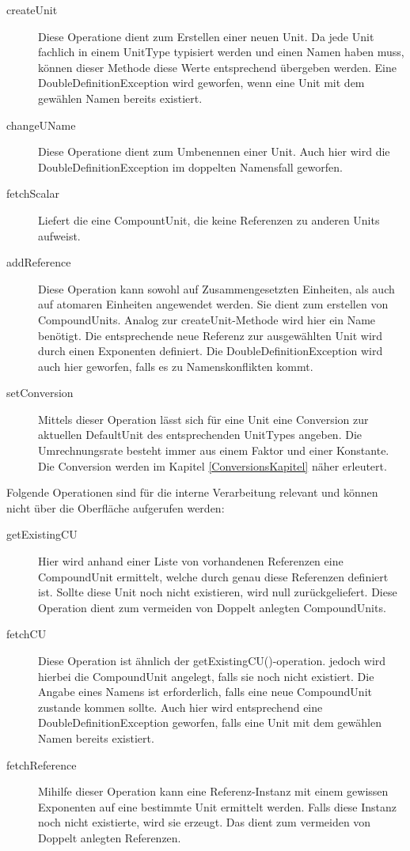 \begin{description}
\item[createUnit]
Diese Operatione dient zum Erstellen einer neuen Unit. Da jede Unit fachlich in einem UnitType typisiert werden und einen Namen haben muss, können dieser Methode diese Werte entsprechend übergeben werden. Eine DoubleDefinitionException wird geworfen, wenn eine Unit mit dem gewählen Namen bereits existiert.
\item[changeUName]
Diese Operatione dient zum Umbenennen einer Unit. Auch hier wird die DoubleDefinitionException im doppelten Namensfall geworfen.
\item[fetchScalar]
Liefert die eine CompountUnit, die keine Referenzen zu anderen Units aufweist.
\item[addReference]
Diese Operation kann sowohl auf Zusammengesetzten Einheiten, als auch auf atomaren Einheiten angewendet werden. Sie dient zum erstellen von CompoundUnits. Analog zur createUnit-Methode wird hier ein Name benötigt. Die entsprechende neue Referenz zur ausgewählten Unit wird durch einen Exponenten definiert. Die DoubleDefinitionException wird auch hier geworfen, falls es zu Namenskonflikten kommt.
\item[setConversion]
Mittels dieser Operation lässt sich für eine Unit eine Conversion zur aktuellen DefaultUnit des entsprechenden UnitTypes angeben. Die Umrechnungsrate besteht immer aus einem Faktor und einer Konstante. Die Conversion werden im Kapitel \ref{ConversionsKapitel} näher erleutert.
\end{description}

Folgende Operationen sind für die interne Verarbeitung relevant und können nicht über die Oberfläche aufgerufen werden:
\begin{description}

\item[getExistingCU]
Hier wird anhand einer Liste von vorhandenen Referenzen eine CompoundUnit ermittelt, welche durch genau diese Referenzen definiert ist. Sollte diese Unit noch nicht existieren, wird null zurückgeliefert. Diese Operation dient zum vermeiden von Doppelt anlegten CompoundUnits.
\item[fetchCU]
Diese Operation ist ähnlich der getExistingCU()-operation. jedoch wird hierbei die CompoundUnit angelegt, falls sie noch nicht existiert. Die Angabe eines Namens ist erforderlich, falls eine neue CompoundUnit zustande kommen sollte. Auch hier wird entsprechend eine DoubleDefinitionException geworfen, falls eine Unit mit dem gewählen Namen bereits existiert.
\item[fetchReference]
Mihilfe dieser Operation kann eine Referenz-Instanz mit einem gewissen Exponenten auf eine bestimmte Unit ermittelt werden. Falls diese Instanz noch nicht existierte, wird sie erzeugt. Das dient zum vermeiden von Doppelt anlegten Referenzen.
\end{description}

